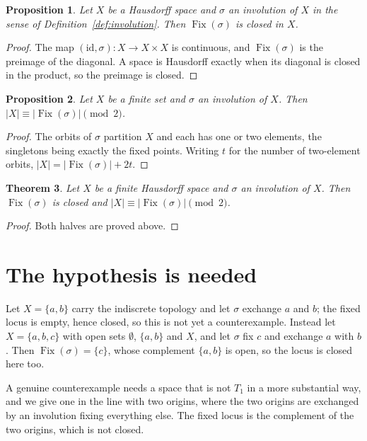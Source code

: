 \documentclass[11pt]{article}
\theoremstyle{plain}
\newtheorem{theorem}{Theorem}[section]
\newtheorem{proposition}[theorem]{Proposition}
\theoremstyle{definition}
\DeclareMathOperator{\Fix}{Fix}
\begin{document}
\begin{proposition}\label{prop:closed}
Let $X$ be a Hausdorff space and $\sigma$ an involution of $X$ in the sense of Definition~\ref{def:involution}. Then $\Fix(\sigma)$ is closed in $X$.
\end{proposition}

\begin{proof}
The map $(\mathrm{id}, \sigma) \colon X \to X \times X$ is continuous, and $\Fix(\sigma)$ is the preimage of the diagonal. A space is Hausdorff exactly when its diagonal is closed in the product, so the preimage is closed.
\end{proof}

\begin{proposition}\label{prop:parity}
Let $X$ be a finite set and $\sigma$ an involution of $X$. Then $|X| \equiv |\Fix(\sigma)| \pmod 2$.
\end{proposition}

\begin{proof}
The orbits of $\sigma$ partition $X$ and each has one or two elements, the singletons being exactly the fixed points. Writing $t$ for the number of two-element orbits, $|X| = |\Fix(\sigma)| + 2t$.
\end{proof}

\begin{theorem}\label{thm:both}
Let $X$ be a finite Hausdorff space and $\sigma$ an involution of $X$. Then $\Fix(\sigma)$ is closed and $|X| \equiv |\Fix(\sigma)| \pmod 2$.
\end{theorem}

\begin{proof}
Both halves are proved above.
\end{proof}

\section{The hypothesis is needed}

Let $X = \{a, b\}$ carry the indiscrete topology and let $\sigma$ exchange $a$ and $b$; the fixed locus is empty, hence closed, so this is not yet a counterexample. Instead let $X = \{a, b, c\}$ with open sets $\emptyset$, $\{a, b\}$ and $X$, and let $\sigma$ fix $c$ and exchange $a$ with $b$. Then $\Fix(\sigma) = \{c\}$, whose complement $\{a, b\}$ is open, so the locus is closed here too.

A genuine counterexample needs a space that is not $T_1$ in a more substantial way, and we give one in the line with two origins, where the two origins are exchanged by an involution fixing everything else. The fixed locus is the complement of the two origins, which is not closed.
\end{document}
